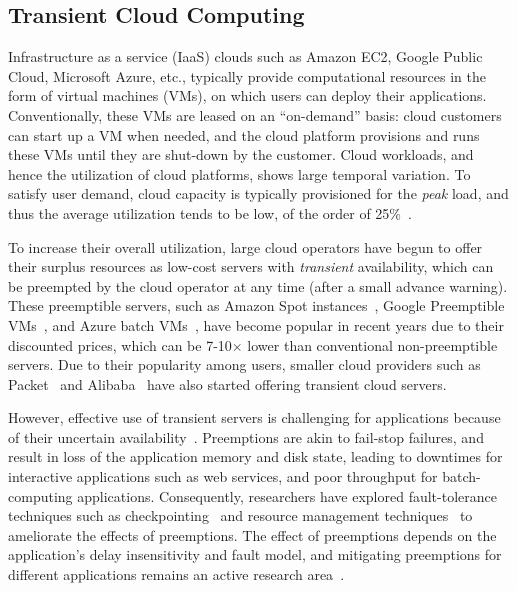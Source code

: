 \documentclass[sigconf]{acmart} %
\newcommand{\subsecspace}[0]{-0.20cm}
\begin{document}
\vspace*{\subsecspace}
\subsection{Transient Cloud Computing}

Infrastructure as a service (IaaS) clouds such as Amazon EC2, Google Public Cloud, Microsoft Azure, etc., typically provide computational resources in the form of virtual machines (VMs), on which users can deploy their applications.
Conventionally, these VMs are leased on an ``on-demand'' basis: cloud customers can start up a VM when needed, and the cloud platform provisions and runs these VMs until they are shut-down by the customer. 
Cloud workloads, and hence the utilization of cloud platforms, shows large temporal variation. 
To satisfy user demand, cloud capacity is typically provisioned for the \emph{peak} load, and thus the average utilization tends to be low, of the order of 25\%~\cite{borg,resource-central-sosp17}. 

To increase their overall utilization, large cloud operators have begun to offer their surplus resources as low-cost servers \footnotemark with \emph{transient} availability, which can be preempted by the cloud operator at any time (after a small advance warning). 
These preemptible servers, such as Amazon Spot instances~\cite{ec2-spot}, Google Preemptible VMs~\cite{preemptible-documentation}, and Azure batch VMs~\cite{azure-batch}, have become popular in recent years due to their discounted prices, which can be 7-10$\times$ lower than conventional non-preemptible servers.
Due to their popularity among users, smaller cloud providers such as Packet~\cite{packet-spot} and Alibaba~\cite{alibaba-spot} have also started offering transient cloud servers. 


However, effective use of transient servers is challenging for applications because of their uncertain availability~\cite{transient}. 
Preemptions are akin to fail-stop failures, and result in loss of the application memory and disk state, leading to downtimes for interactive applications such as web services, and poor throughput for batch-computing applications. 
Consequently, researchers have explored fault-tolerance techniques such as checkpointing~\cite{flint, marathe2014exploiting, spoton} and resource management techniques~\cite{exosphere} to ameliorate the effects of preemptions.
The effect of preemptions depends on the application's delay insensitivity and fault model, and mitigating preemptions for different applications remains an active research area~\cite{hourglass-eurosys19}. 
\end{document}

